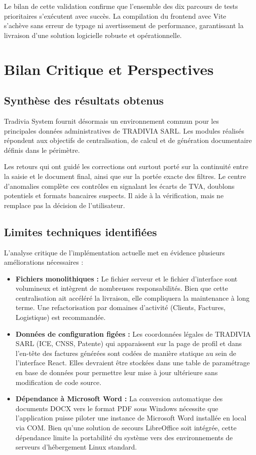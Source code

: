 \documentclass[12pt,a4paper,oneside]{report}
\newcommand{\Entreprise}{TRADIVIA SARL}
\newcommand{\sourcefile}[1]{\path{#1}}
\begin{document}
Le bilan de cette validation confirme que l'ensemble des dix parcours de tests prioritaires s'exécutent avec succès. La compilation du frontend avec Vite s'achève sans erreur de typage ni avertissement de performance, garantissant la livraison d'une solution logicielle robuste et opérationnelle.

\chapter{Bilan Critique et Perspectives}
\section{Synthèse des résultats obtenus}
Tradivia System fournit désormais un environnement commun pour les principales données administratives de \Entreprise. Les modules réalisés répondent aux objectifs de centralisation, de calcul et de génération documentaire définis dans le périmètre. 

Les retours qui ont guidé les corrections ont surtout porté sur la continuité entre la saisie et le document final, ainsi que sur la portée exacte des filtres. Le centre d'anomalies complète ces contrôles en signalant les écarts de TVA, doublons potentiels et formats bancaires suspects. Il aide à la vérification, mais ne remplace pas la décision de l'utilisateur.

\section{Limites techniques identifiées}
L'analyse critique de l'implémentation actuelle met en évidence plusieurs améliorations nécessaires :
\begin{itemize}
  \item \textbf{Fichiers monolithiques : } Le fichier serveur \sourcefile{server.cjs} et le fichier d'interface \sourcefile{App.jsx} sont volumineux et intègrent de nombreuses responsabilités. Bien que cette centralisation ait accéléré la livraison, elle compliquera la maintenance à long terme. Une refactorisation par domaines d'activité (Clients, Factures, Logistique) est recommandée.
  \item \textbf{Données de configuration figées : } Les coordonnées légales de \Entreprise{} (ICE, CNSS, Patente) qui apparaissent sur la page de profil et dans l'en-tête des factures générées sont codées de manière statique au sein de l'interface React. Elles devraient être stockées dans une table de paramétrage en base de données pour permettre leur mise à jour ultérieure sans modification de code source.
  \item \textbf{Dépendance à Microsoft Word : } La conversion automatique des documents DOCX vers le format PDF sous Windows nécessite que l'application puisse piloter une instance de Microsoft Word installée en local via COM. Bien qu'une solution de secours LibreOffice soit intégrée, cette dépendance limite la portabilité du système vers des environnements de serveurs d'hébergement Linux standard.
\end{itemize}
\end{document}
